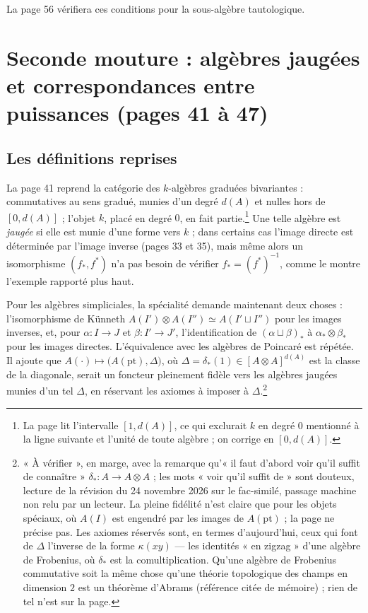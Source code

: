 \documentclass[11pt,a4paper]{article}
\begin{document}
La page 56 vérifiera ces conditions pour la sous-algèbre tautologique.

\section*{Seconde mouture : algèbres jaugées et correspondances entre puissances (pages 41 à 47)}

\subsection*{Les définitions reprises}

La page 41 reprend la catégorie des $k$-algèbres graduées bivariantes :
commutatives au sens gradué, munies d'un degré $d(A)$ et nulles hors de
$[0, d(A)]$ ; l'objet $k$, placé en degré $0$, en fait partie.\footnote{La page
lit l'intervalle $[1, d(A)]$, ce qui exclurait $k$ en degré $0$ mentionné à la
ligne suivante et l'unité de toute algèbre ; on corrige en $[0, d(A)]$.} Une
telle algèbre est \emph{jaugée} si elle est munie d'une forme vers $k$ ; dans
certains cas l'image directe est déterminée par l'image inverse (pages 33 et
35), mais même alors un isomorphisme $(f_{*}, f^{*})$ n'a pas besoin de
vérifier $f_{*} = (f^{*})^{-1}$, comme le montre l'exemple rapporté plus haut.

Pour les algèbres simpliciales, la spécialité demande maintenant deux choses :
l'isomorphisme de Künneth $A(I') \otimes A(I'') \simeq A(I' \sqcup I'')$ pour
les images inverses, et, pour $\alpha \colon I \to J$ et
$\beta \colon I' \to J'$, l'identification de
$(\alpha \sqcup \beta)_{*}$ à $\alpha_{*} \otimes \beta_{*}$ pour les images
directes. L'équivalence avec les algèbres de Poincaré est répétée. Il ajoute
que $A(\cdot) \mapsto \bigl(A(\mathrm{pt}), \Delta\bigr)$, où
$\Delta = \delta_{*}(1) \in [A \otimes A]^{d(A)}$ est la classe de la
diagonale, serait un foncteur pleinement fidèle vers les algèbres jaugées
munies d'un tel $\Delta$, en réservant les axiomes à imposer à
$\Delta$.\footnote{« À vérifier », en marge, avec la remarque qu'« il faut
d'abord voir qu'il suffit de connaître » $\delta_{*} \colon A \to A \otimes A$ ;
les mots « voir qu'il suffit de » sont douteux, lecture de la révision du 24 novembre 2026 sur le fac-similé,
passage machine non relu par un lecteur. La pleine fidélité
n'est claire que pour les objets spéciaux, où $A(I)$ est engendré par les
images de $A(\mathrm{pt})$ ; la page ne précise pas. Les axiomes réservés
sont, en termes d'aujourd'hui, ceux qui font de $\Delta$ l'inverse de la forme
$\kappa(xy)$ --- les identités « en zigzag » d'une algèbre de Frobenius, où
$\delta_{*}$ est la comultiplication. Qu'une algèbre de Frobenius commutative
soit la même chose qu'une théorie topologique des champs en dimension $2$ est
un théorème d'Abrams (référence citée de mémoire) ; rien de tel n'est sur
la page.}
\end{document}
